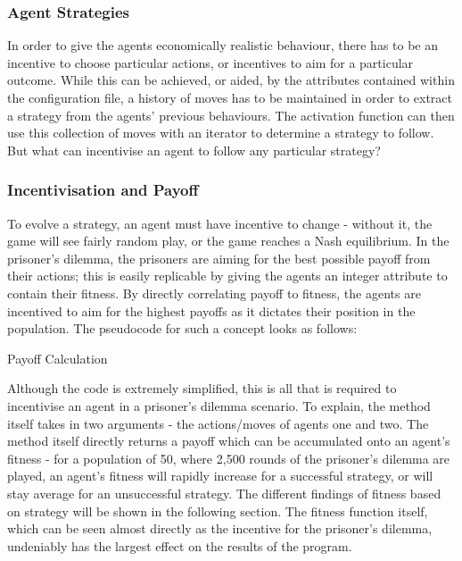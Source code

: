 \documentclass[12pt,a4paper]{article}
\begin{document}
\subsubsection{Agent Strategies}
In order to give the agents economically realistic behaviour, there has to be an incentive to choose particular actions, or incentives to aim for a particular outcome. While this can be achieved, or aided, by the attributes contained within the configuration file, a history of moves has to be maintained in order to extract a strategy from the agents' previous behaviours. The activation function can then use this collection of moves with an iterator to determine a strategy to follow. But what can incentivise an agent to follow any particular strategy?

\subsubsection{Incentivisation and Payoff}
To evolve a strategy, an agent must have incentive to change - without it, the game will see fairly random play, or the game reaches a Nash equilibrium. In the prisoner's dilemma, the prisoners are aiming for the best possible payoff from their actions; this is easily replicable by giving the agents an integer attribute to contain their fitness. By directly correlating payoff to fitness, the agents are incentived to aim for the highest payoffs as it dictates their position in the population. The pseudocode for such a concept looks as follows:

\begin{algorithm}[H]
\caption{Payoff Calculation}\label{euclid}
\begin{algorithmic}[1]

\EndIf

\EndIf

\EndIf

\EndIf

\EndProcedure
\end{algorithmic}
\end{algorithm}

Although the code is extremely simplified, this is all that is required to incentivise an agent in a prisoner's dilemma scenario. To explain, the method itself takes in two arguments - the actions/moves of agents one and two. The method itself directly returns a payoff which can be accumulated onto an agent's fitness - for a population of 50, where 2,500 rounds of the prisoner's dilemma are played, an agent's fitness will rapidly increase for a successful strategy, or will stay average for an unsuccessful strategy. The different findings of fitness based on strategy will be shown in the following section. The fitness function itself, which can be seen almost directly as the incentive for the prisoner's dilemma, undeniably has the largest effect on the results of the program.
\end{document}
